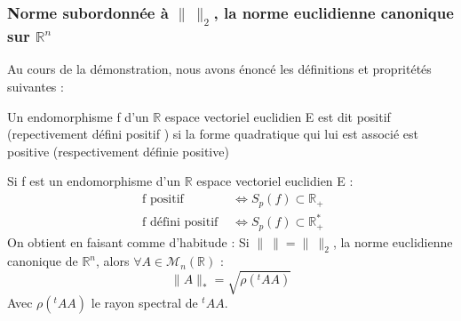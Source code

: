 \subsubsection{Norme subordonnée à $\parallel~\parallel_2$, la norme euclidienne canonique sur $\mathbb{R}^n$}
Au cours de la démonstration, nous avons énoncé les définitions et propritétés suivantes : 
\begin{de}
Un endomorphisme f d'un $\mathbb{R}$ espace vectoriel euclidien E est dit positif (repectivement défini positif ) si la forme quadratique qui lui est associé est positive (respectivement définie positive)
\end{de} 
\begin{prop}
Si f est un endomorphisme d'un $\mathbb{R}$ espace vectoriel euclidien E :
\begin{align*}
 \text{ f positif } &\Leftrightarrow S_p(f) \subset \mathbb{R}_+ \\
 \text{ f défini positif } &\Leftrightarrow S_p(f) \subset \mathbb{R}_+^*
\end{align*}
On obtient en faisant comme d'habitude : Si $\parallel~\parallel = \parallel~\parallel_2$, la norme euclidienne canonique de $\mathbb{R}^n$, alors $\forall A \in \mathcal{M}_n(\mathbb{R})$ : 
$$\parallel A\parallel_* = \sqrt{\rho(^tA A)}$$
Avec $\rho(^tAA)$ le rayon spectral de $^tAA$.
\end{prop}
